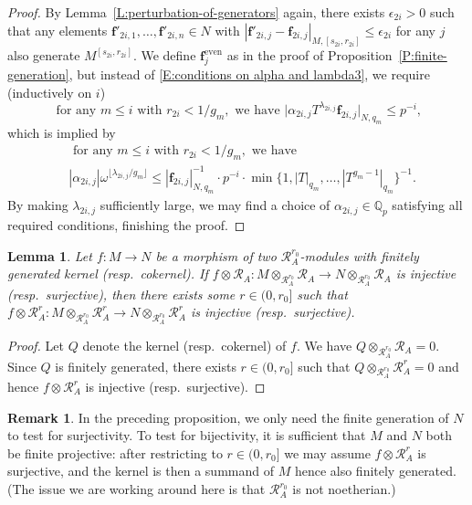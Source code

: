 \documentclass[12pt]{article}
\newtheorem{lemma}[theorem]{Lemma}
\theoremstyle{definition}
\newtheorem{remark}[theorem]{Remark}
\numberwithin{equation}{theorem}
\newcommand{\calR}{\mathcal{R}}
\newcommand{\QQ}{\mathbb{Q}}
\newcommand{\bbf}{\mathbf{f}}
\newcommand{\even}{\mathrm{even}}
\def\Qp{\QQ_p}
\begin{document}
\begin{proof}
By Lemma~\ref{L:perturbation-of-generators} again, there exists $\epsilon_{2i}>0$ such that any elements $\bbf'_{2i, 1}, \dots, \bbf'_{2i,n} \in N$ with $|\bbf'_{2i,j} - \bbf_{2i,j}|_{M, [s_{2i}, r_{2i}]}\leq \epsilon_{2i}$ for any $j$ also generate  $M^{[s_{2i}, r_{2i}]}$.  We define $\bbf_j^\even$ as in the proof of Proposition~\ref{P:finite-generation}, but instead of \eqref{E:conditions on alpha and lambda3}, we require (inductively on $i$)
\[
\textrm{ for any }m \leq i\textrm{ with }r_{2i}<1/g_m,\textrm{ we have }\big|\alpha_{2i,j}T^{\lambda_{2i,j}}\bbf_{2i,j}
\big|_{N, q_m} \leq p^{-i},
\]
which is implied by
\begin{eqnarray*}
&\textrm{ for any }m \leq i\textrm{ with }r_{2i}<1/g_m,\textrm{ we have }\\
&|\alpha_{2i,j}|\omega^{\lfloor\lambda_{2i,j}/g_m\rfloor} \leq |\bbf_{2i,j}|_{N, q_m}^{-1}\cdot p^{-i} \cdot \min\{1, |T|_{q_m}, \dots, |T^{g_m-1}|_{q_m}\}^{-1}.
\end{eqnarray*}
By making $\lambda_{2i,j}$ sufficiently large, we may find a choice of $\alpha_{2i,j} \in \Qp$ satisfying all required conditions, finishing the proof.
\end{proof}



\begin{lemma}
\label{L:isom on Robba descent}
Let $f: M \to N$ be a morphism of two $\calR_A^{r_0}$-modules with
finitely generated kernel (resp.\ cokernel).  If $f \otimes \calR_A: M
\otimes_{\calR_A^{r_0}} \calR_A \to N \otimes_{\calR_A^{r_0}} \calR_A$
is injective (resp.\ surjective), then there exists some $r \in (0,
r_0]$ such that $f \otimes \calR_A^r: M \otimes_{\calR_A^{r_0}}
\calR_A^r \to N \otimes_{\calR_A^{r_0}} \calR_A^r$ is injective
(resp.\ surjective).
\end{lemma}
\begin{proof}
Let $Q$ denote the kernel (resp.\ cokernel) of $f$.  We have $Q
\otimes_{\calR_A^{r_0}}\calR_A = 0$.  Since $Q$ is finitely generated,
there exists $r \in (0, r_0]$ such that $Q
\otimes_{\calR_A^{r_0}}\calR_A^{r} = 0$ and hence $f\otimes \calR_A^r$
is injective (resp.\ surjective).
\end{proof}



\begin{remark}\label{R:isom on Robba descent}
In the preceding proposition, we only need the finite generation of $N$ to test for surjectivity.  To test for bijectivity, it is sufficient that $M$ and $N$ both be finite projective: after restricting to $r \in (0,r_0]$ we may assume $f \otimes \calR_A^r$ is surjective, and the kernel is then a summand of $M$ hence also finitely generated.  (The issue we are working around here is that $\calR_A^{r_0}$ is not noetherian.)
\end{remark}
\end{document}
